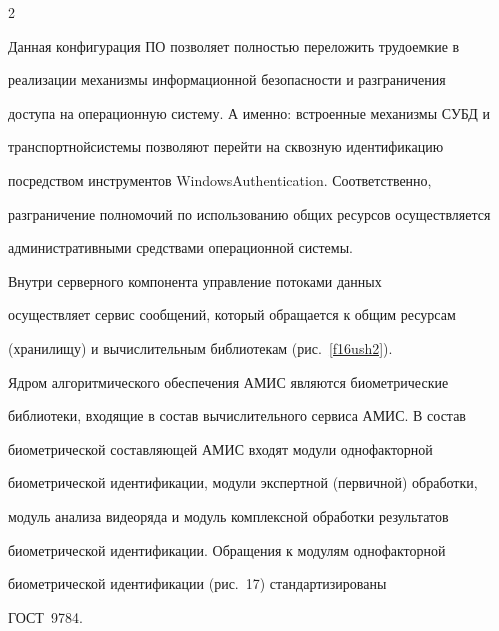 \begin{multicols}{2}
\begin{figure}
  \end{figure}



  

  Данная конфигурация ПО позволяет пол\-ностью переложить трудоемкие в 

реализации механизмы информационной безопасности и разграничения 

доступа на операционную сис\-те\-му. А именно: встро\-ен\-ные механизмы СУБД и 

транспортной\linebreak сис\-те\-мы позволяют перейти на сквозную идентификацию 

посредством инструментов Windows\linebreak Au\-thenti\-cation. Соответственно, 

разграничение полномочий по использованию общих ресурсов осуществляется 

административными средствами операционной системы.  

{ %



}



  

  Внутри серверного компонента управление потоками данных 

осуществляет сервис сообщений, который обращается к общим ресурсам 

(хранилищу) и вычислительным библиотекам (рис.~\ref{f16ush2}). 



 

  Ядром алгоритмического обеспечения АМИС являются биометрические 

библиотеки, входящие в состав вычислительного сервиса АМИС.  В состав 

биометрической составляющей АМИС входят модули однофакторной 

биометрической идентификации, модули экспертной (первичной) обработки, 

модуль анализа видеоряда и модуль комплексной обработки результатов 

биометрической идентификации. Обращения к модулям однофакторной 

биометрической идентификации (рис.~17) стандартизированы 

ГОСТ~9784.





  


\end{multicols}
